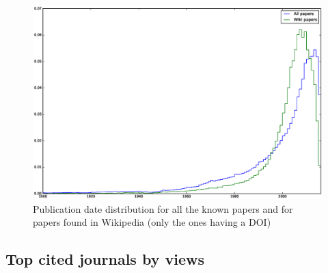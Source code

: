 \begin{figure}[h]
\centering
\includegraphics[keepaspectratio=true, width=\textwidth]{assets/publication_date_pdf}
\caption{Publication date distribution for all the known papers and for papers found in Wikipedia (only the ones having a DOI)}
\label{fig:publication_date_pdf}
\end{figure}

\subsection{Top cited journals by views}
